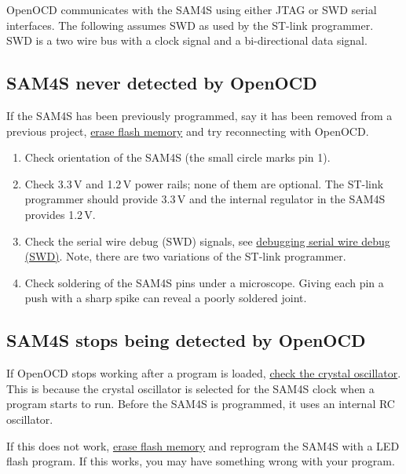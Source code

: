 OpenOCD communicates with the SAM4S using either JTAG or SWD serial
interfaces.  The following assumes SWD as used by the ST-link
programmer.  SWD is a two wire bus with a clock signal and a
bi-directional data signal.


\subsection{SAM4S never detected by OpenOCD}

If the SAM4S has been previously programmed, say it has been removed
from a previous project, \hyperref[erasing-flash-memory]{erase flash
  memory} and try reconnecting with OpenOCD.

%
\begin{enumerate}
\item
  Check orientation of the SAM4S (the small circle marks pin 1).

\item
  Check 3.3\,V and 1.2\,V power rails; none of them are optional.  The
  ST-link programmer should provide 3.3\,V and the internal regulator
  in the SAM4S provides 1.2\,V.

\item
  Check the serial wire debug (SWD) signals, see
  \protect\hyperref[debugging]{debugging serial wire debug (SWD)}.
  Note, there are two variations of the ST-link programmer.

\item
  Check soldering of the SAM4S pins under a microscope.  Giving
  each pin a push with a sharp spike can reveal a poorly soldered joint.

\end{enumerate}


\subsection{SAM4S stops being detected by OpenOCD}

If OpenOCD stops working after a program is loaded,
\protect\hyperref[checking-the-crystal-oscillator]{check the crystal
  oscillator}.  This is because the crystal oscillator is selected for
the SAM4S clock when a program starts to run.  Before the SAM4S is
programmed, it uses an internal RC oscillator.

If this does not work, \hyperref[erasing-flash-memory]{erase flash
  memory} and reprogram the SAM4S with a LED flash program.  If this
works, you may have something wrong with your program.



